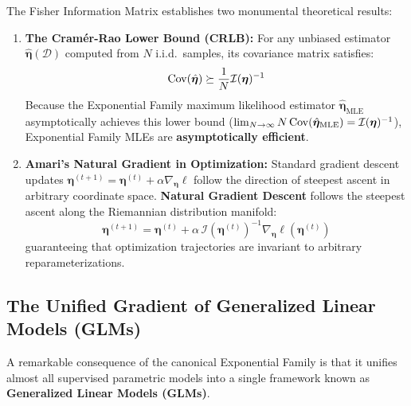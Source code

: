 \begin{tcolorbox}[
    colback=forest!10,
    colframe=forest,
    title={\textbf{The Cramér-Rao Lower Bound and Natural Gradients}},
    fonttitle=\bfseries\sffamily,
    arc=2mm,
    boxrule=1pt
]
The Fisher Information Matrix establishes two monumental theoretical results:
\begin{enumerate}
    \item \textbf{The Cramér-Rao Lower Bound (CRLB):} For any unbiased estimator $\hat{\boldsymbol{\eta}}(\mathcal{D})$ computed from $N$ i.i.d.\ samples, its covariance matrix satisfies:
    \begin{equation}
    \operatorname{Cov}(\hat{\boldsymbol{\eta}}) \succeq \frac{1}{N} \mathcal{I}(\boldsymbol{\eta})^{-1}
    \end{equation}
    Because the Exponential Family maximum likelihood estimator $\hat{\boldsymbol{\eta}}_{\text{MLE}}$ asymptotically achieves this lower bound ($\lim_{N \to \infty} N \operatorname{Cov}(\hat{\boldsymbol{\eta}}_{\text{MLE}}) = \mathcal{I}(\boldsymbol{\eta})^{-1}$), Exponential Family MLEs are \textbf{asymptotically efficient}.
    \item \textbf{Amari's Natural Gradient in Optimization:} Standard gradient descent updates $\boldsymbol{\eta}^{(t+1)} = \boldsymbol{\eta}^{(t)} + \alpha \nabla_{\boldsymbol{\eta}} \ell$ follow the direction of steepest ascent in arbitrary coordinate space. \textbf{Natural Gradient Descent} follows the steepest ascent along the Riemannian distribution manifold:
    \begin{equation}
    \boldsymbol{\eta}^{(t+1)} = \boldsymbol{\eta}^{(t)} + \alpha \, \mathcal{I}(\boldsymbol{\eta}^{(t)})^{-1} \nabla_{\boldsymbol{\eta}} \ell(\boldsymbol{\eta}^{(t)})
    \end{equation}
    guaranteeing that optimization trajectories are invariant to arbitrary reparameterizations.
\end{enumerate}
\end{tcolorbox}

\subsection{The Unified Gradient of Generalized Linear Models (GLMs)}
A remarkable consequence of the canonical Exponential Family is that it unifies almost all supervised parametric models into a single framework known as \textbf{Generalized Linear Models (GLMs)}.

